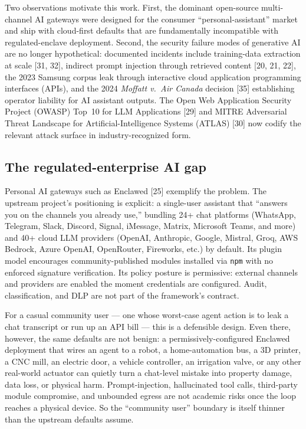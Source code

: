 \documentclass[11pt]{article}
\begin{document}
Two observations motivate this work. First, the dominant open-source
multi-channel AI gateways were designed for the consumer
``personal-assistant'' market and ship with cloud-first defaults that
are fundamentally incompatible with regulated-enclave deployment.
Second, the security failure modes of generative AI are no longer
hypothetical: documented incidents include training-data extraction at
scale [31, 32], indirect prompt injection through retrieved content
[20, 21, 22], the 2023 Samsung corpus leak through interactive cloud
application programming interfaces (APIs), and the 2024 \emph{Moffatt
v.\ Air Canada} decision [35] establishing operator liability for AI
assistant outputs. The Open Web Application Security Project (OWASP)
Top~10 for LLM Applications [29] and MITRE Adversarial Threat Landscape
for Artificial-Intelligence Systems (ATLAS) [30] now codify the
relevant attack surface in industry-recognized form.

\subsection{The regulated-enterprise AI gap}

Personal AI gateways such as Enclawed [25] exemplify the problem. The
upstream project's positioning is explicit: a single-user assistant
that ``answers you on the channels you already use,'' bundling 24+
chat platforms (WhatsApp, Telegram, Slack, Discord, Signal, iMessage,
Matrix, Microsoft Teams, and more) and 40+ cloud LLM providers (OpenAI,
Anthropic, Google, Mistral, Groq, AWS Bedrock, Azure OpenAI, OpenRouter,
Fireworks, etc.) by default. Its plugin model encourages
community-published modules installed via \texttt{npm} with no enforced
signature verification. Its policy posture is permissive: external
channels and providers are enabled the moment credentials are
configured. Audit, classification, and DLP are not part of the
framework's contract.

For a casual community user --- one whose worst-case agent action is
to leak a chat transcript or run up an API bill --- this is a
defensible design. Even there, however, the same defaults are not
benign: a permissively-configured Enclawed deployment that wires an
agent to a robot, a home-automation bus, a 3D printer, a CNC mill, an
electric door, a vehicle controller, an irrigation valve, or any
other real-world actuator can quietly turn a chat-level mistake into
property damage, data loss, or physical harm. Prompt-injection,
hallucinated tool calls, third-party module compromise, and unbounded
egress are not academic risks once the loop reaches a physical
device. So the ``community user'' boundary is itself thinner than the
upstream defaults assume.
\end{document}
